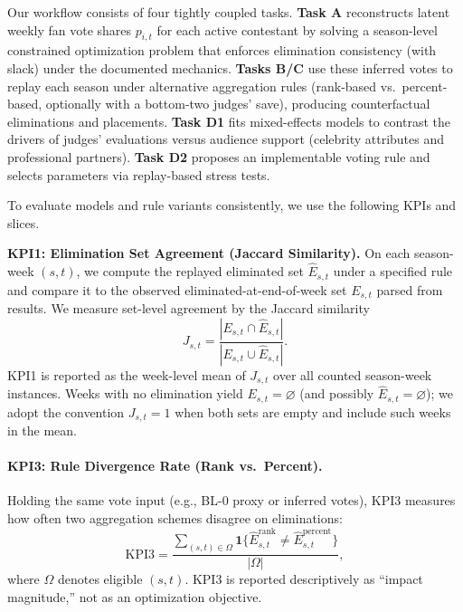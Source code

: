 Our workflow consists of four tightly coupled tasks. \textbf{Task A} reconstructs latent weekly fan vote shares $p_{i,t}$
for each active contestant by solving a season-level constrained optimization problem that enforces elimination consistency
(with slack) under the documented mechanics\cite{bubeck2015convex,boyd2004convex}. \textbf{Tasks B/C} use these inferred votes to replay each season under
alternative aggregation rules (rank-based vs.\ percent-based, optionally with a bottom-two judges' save), producing
counterfactual eliminations and placements. \textbf{Task D1} fits mixed-effects models to contrast the drivers of judges'
evaluations versus audience support (celebrity attributes and professional partners). \textbf{Task D2} proposes an
implementable voting rule and selects parameters via replay-based stress tests.

To evaluate models and rule variants consistently, we use the following KPIs and slices.

\textbf{KPI1: Elimination Set Agreement (Jaccard Similarity).}
On each season-week $(s,t)$, we compute the replayed eliminated set $\hat{E}_{s,t}$ under a specified rule
and compare it to the observed eliminated-at-end-of-week set $E_{s,t}$ parsed from results. We measure
set-level agreement by the Jaccard similarity
\[
J_{s,t}=\frac{|E_{s,t}\cap \hat{E}_{s,t}|}{|E_{s,t}\cup \hat{E}_{s,t}|}.
\]
KPI1 is reported as the week-level mean of $J_{s,t}$ over all counted season-week instances.
Weeks with no elimination yield $E_{s,t}=\varnothing$ (and possibly $\hat{E}_{s,t}=\varnothing$); we adopt the
convention $J_{s,t}=1$ when both sets are empty and include such weeks in the mean.

\paragraph{KPI3: Rule Divergence Rate (Rank vs.\ Percent).}
Holding the same vote input (e.g., BL-0 proxy or inferred votes), KPI3 measures how often two aggregation schemes disagree
on eliminations:
\begin{equation}
\text{KPI3}=\frac{\sum_{(s,t)\in\Omega}\mathbf{1}\{\widehat{E}^{\text{rank}}_{s,t}\neq \widehat{E}^{\text{percent}}_{s,t}\}}{|\Omega|},
\end{equation}
where $\Omega$ denotes eligible $(s,t)$. KPI3 is reported descriptively as ``impact magnitude,'' not as an optimization objective.

